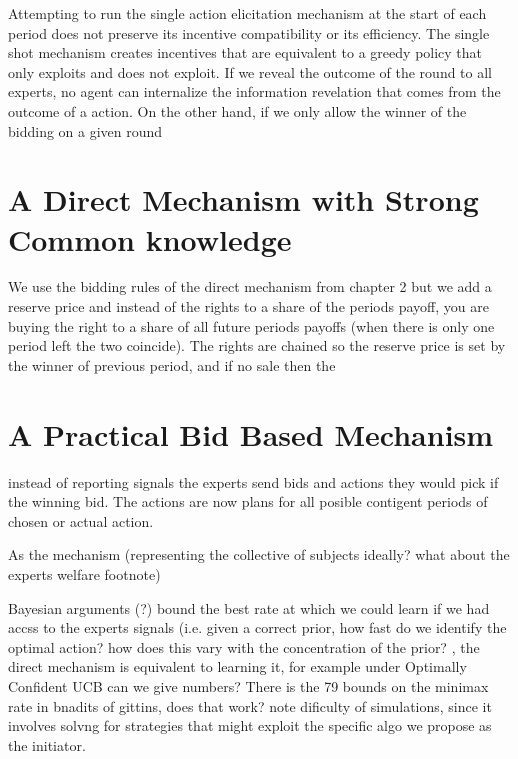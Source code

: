 Attempting to run the single action elicitation mechanism at the start of each period does not preserve its incentive compatibility or its efficiency.
The single shot mechanism creates incentives that are equivalent to a greedy policy that only exploits and does not exploit. If we reveal the outcome of the round to all experts,  no agent can internalize the information revelation that comes from the outcome of a action. On the other hand, if we only allow the winner of the bidding on a given round 

\section{A Direct Mechanism with Strong Common knowledge}

We use the bidding rules of the direct mechanism from chapter 2 but we add a reserve price and instead of the rights to a share of the periods payoff, you are buying the right to a share of all future periods payoffs (when there is only one period left the two coincide). The rights are chained so the reserve price is set by the winner of previous period, and if no sale then the 

\section{A Practical Bid Based Mechanism}

instead of reporting signals the experts send bids and actions they would pick if the winning bid. The actions are now plans for all posible contigent periods of chosen or actual action. 

As the mechanism (representing the collective of subjects ideally?  what about the experts welfare footnote) 







Bayesian arguments  (?)  bound the best rate at which we could learn if we had accss to the experts signals (i.e. given a correct prior, how fast do we identify the optimal action? how does this vary with the concentration of the prior? , the direct mechanism is equivalent to learning it, for example under Optimally Confident UCB can we give numbers? There is the 79 bounds on the minimax rate in bnadits of gittins, does that work? note dificulty of simulations, since it involves solvng for strategies that might exploit the specific algo we propose as the initiator.

